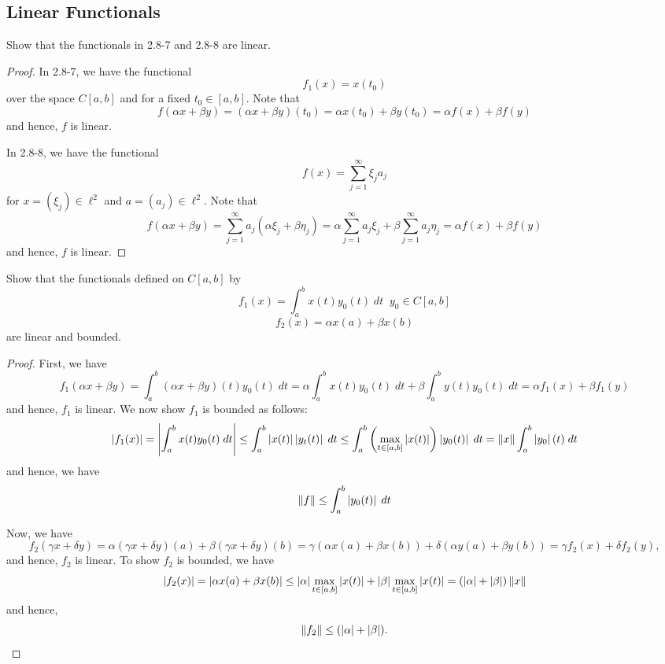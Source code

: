 \subsection{Linear Functionals}

\begin{question}
    Show that the functionals in 2.8-7 and 2.8-8 are linear.
    \label{section2.8-1}
\end{question}
\begin{proof}
    In 2.8-7, we have the functional
    \[f_1(x) = x(t_0)\]
    over the space $C[a,b]$ and for a fixed $t_0 \in [a,b]$. Note that
    \[f(\alpha x + \beta y) = (\alpha x + \beta y)(t_0) = \alpha x(t_0) + \beta y(t_0) = \alpha f(x) + \beta f(y)\]
    and hence, $f$ is linear.

    In 2.8-8, we have the functional 
    \[f(x) = \sum_{j=1}^\infty \xi_j a_j\]
    for $x = (\xi_j) \in \ell^2$ and $a = (a_j) \in \ell^2.$
    Note that
    \[f(\alpha x + \beta y) = \sum_{j=1}^\infty a_j(\alpha \xi_j + \beta \eta_j) = \alpha \sum_{j=1}^\infty  a_j \xi_j + \beta \sum_{j=1}^\infty a_j \eta_j = \alpha f(x) + \beta f(y) \]
    and hence, $f$ is linear.
\end{proof}

\begin{question}
    Show that the functionals defined on $C[a,b]$ by
    \[f_1(x) = \int_{a}^{b} x(t) y_0(t) \;dt \;\; y_0 \in C[a,b]\]
    \[f_2(x) = \alpha x(a)+ \beta x(b)\]
    are linear and bounded.
    \label{section2.8-2}
\end{question}
\begin{proof}
    First, we have
    \[f_1(\alpha x + \beta y) = \int_{a}^{b} (\alpha x + \beta y)(t) y_0(t) \; dt = \alpha \int_{a}^{b} x(t) y_0(t) \; dt + \beta \int_{a}^{b} y(t)y_0(t) \; dt = \alpha f_1(x) + \beta f_1(y)\]
    and hence, $f_1$ is linear. We now show $f_1$ is bounded as follows:
    \[\left\lvert f_1(x) \right\rvert = \left\lvert \int_{a}^{b} x(t) y_0(t) \; dt \right\rvert \leq \int_{a}^{b} \left\lvert x(t) \right\rvert\left\lvert y_t(t) \right\rvert \;dt \leq \int_{a}^{b} \left( \max_{t \in [a,b]} \left\lvert x(t) \right\rvert  \right) \left\lvert y_0(t) \right\rvert \;dt = \left\lVert x \right\rVert \int_{a}^{b} \left\lvert y_0 \right\rvert(t) \; dt\]
    and hence, we have
    \[\left\lVert f \right\rVert \leq \int_{a}^{b} \left\lvert y_0(t) \right\rvert \; dt \]

    Now, we have
    \[f_2(\gamma x + \delta y) = \alpha (\gamma x + \delta y)(a) + \beta (\gamma x + \delta y)(b) = \gamma (\alpha x(a) + \beta x(b)) + \delta (\alpha y(a) + \beta y(b)) = \gamma f_2(x) + \delta f_2(y), \]
    and hence, $f_2$ is linear. To show $f_2$ is bounded, we have
    \[\left\lvert f_2(x) \right\rvert = \left\lvert \alpha x(a) + \beta x(b) \right\rvert \leq \left\lvert \alpha \right\rvert \max_{t \in [a,b]} \left\lvert x(t) \right\rvert + \left\lvert \beta \right\rvert \max_{t \in [a,b]} \left\lvert x(t) \right\rvert = (\left\lvert \alpha \right\rvert + \left\lvert \beta \right\rvert) \left\lVert x \right\rVert\]
    and hence, 
    \[\left\lVert f_2 \right\rVert \leq (\left\lvert \alpha \right\rvert + \left\lvert \beta \right\rvert).\]
\end{proof}

